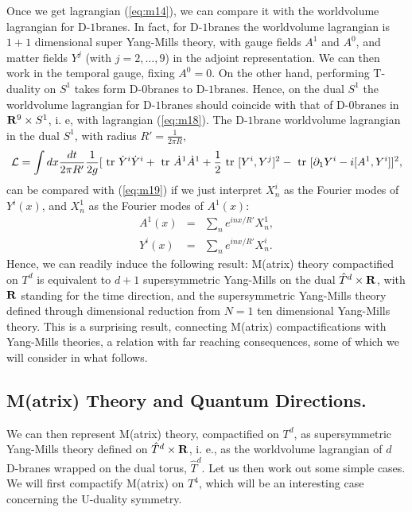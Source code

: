 Once we get lagrangian (\ref{eq:m14}), we can compare it with the
worldvolume lagrangian for D-$1$branes. In fact, for D-$1$branes
the worldvolume lagrangian is $1+1$ dimensional super Yang-Mills
theory, with gauge fields $A^1$ and $A^0$, and matter fields
$Y^j$ (with $j=2, \ldots, 9$) in the adjoint representation. We
can then work in the temporal gauge, fixing $A^0=0$. On the other
hand, performing T-duality on $S^1$ takes form D-$0$branes to
D-$1$branes. Hence, on the dual $S^1$ the worldvolume lagrangian
for D-$1$branes should coincide with that of D-$0$branes in ${\bf
R}^9 \times S^1$, i. e, with lagrangian (\ref{eq:m18}). The
D-$1$brane worldvolume lagrangian in the dual $S^1$, with radius
$R'= \frac {1}{2 \pi R}$,
\begin{equation}
{\cal L} = \int dx \frac {dt}{2 \pi R'} \frac {1}{2g} [ \hbox{ tr
} \dot{Y}^{i} \dot{Y}^{i} + \hbox { tr } \dot{A}^1 \dot{A}^1 +
\frac {1}{2} \hbox { tr } [Y^{i},Y^{j}]^2- \hbox { tr }
[\partial_1 Y^{i} - i[A^1,Y^{i}]]^2,
\label{eq:m20}
\end{equation}
can be compared with (\ref{eq:m19}) if we just interpret
$X^{i}_n$ as the Fourier modes of $Y^{i}(x)$, and $X^{1}_n$ as
the Fourier modes of $A^1(x)$:
\begin{eqnarray}
A^1(x) & = & \sum_n e^{inx/R'} X^1_n, \nonumber \\
Y^{i}(x) & = & \sum_n e^{inx/R'} X^{i}_n.
\label{eq:m21}
\end{eqnarray}
Hence, we can readily induce the following result: M(atrix)
theory compactified on $T^d$ is equivalent to $d+1$
supersymmetric Yang-Mills on the dual $\hat{T}^d \times {\bf R}$,
with ${\bf R}$ standing for the time direction, and the
supersymmetric Yang-Mills theory defined through dimensional
reduction from $N=1$ ten dimensional Yang-Mills theory. This is a
surprising result, connecting M(atrix) compactifications with
Yang-Mills theories, a relation with far reaching consequences,
some of which we will consider in what follows.

\subsection{M(atrix) Theory and Quantum Directions.}

We can then represent M(atrix) theory, compactified on $T^d$, as
supersymmetric Yang-Mills theory defined on $\hat{T}^d \times {\bf
R}$, i. e., as the worldvolume lagrangian of $d$ D-branes wrapped
on the dual torus, $\hat{T}^d$. Let us then work out some simple
cases. We will first compactify M(atrix) on $T^4$, which will be
an interesting case concerning the U-duality symmetry.
  
